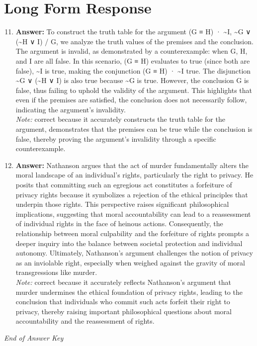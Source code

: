 \documentclass[12pt]{article}
\begin{document}
\section*{Long Form Response}
\begin{enumerate}[label=\arabic*.]
\setcounter{enumi}{10}
\item \textbf{Answer:} To construct the truth table for the argument (G ≡ H) · \textasciitilde{}I, \textasciitilde{}G ∨ (\textasciitilde{}H ∨ I) / G, we analyze the truth values of the premises and the conclusion. The argument is invalid, as demonstrated by a counterexample: when G, H, and I are all false. In this scenario, (G ≡ H) evaluates to true (since both are false), \textasciitilde{}I is true, making the conjunction (G ≡ H) · \textasciitilde{}I true. The disjunction \textasciitilde{}G ∨ (\textasciitilde{}H ∨ I) is also true because \textasciitilde{}G is true. However, the conclusion G is false, thus failing to uphold the validity of the argument. This highlights that even if the premises are satisfied, the conclusion does not necessarily follow, indicating the argument's invalidity.
\\ \textit{Note:} correct because it accurately constructs the truth table for the argument, demonstrates that the premises can be true while the conclusion is false, thereby proving the argument's invalidity through a specific counterexample.
\item \textbf{Answer:} Nathanson argues that the act of murder fundamentally alters the moral landscape of an individual's rights, particularly the right to privacy. He posits that committing such an egregious act constitutes a forfeiture of privacy rights because it symbolizes a rejection of the ethical principles that underpin those rights. This perspective raises significant philosophical implications, suggesting that moral accountability can lead to a reassessment of individual rights in the face of heinous actions. Consequently, the relationship between moral culpability and the forfeiture of rights prompts a deeper inquiry into the balance between societal protection and individual autonomy. Ultimately, Nathanson's argument challenges the notion of privacy as an inviolable right, especially when weighed against the gravity of moral transgressions like murder.
\\ \textit{Note:} correct because it accurately reflects Nathanson's argument that murder undermines the ethical foundation of privacy rights, leading to the conclusion that individuals who commit such acts forfeit their right to privacy, thereby raising important philosophical questions about moral accountability and the reassessment of rights.
\end{enumerate}

\vfill
\noindent\textit{End of Answer Key}
\end{document}
